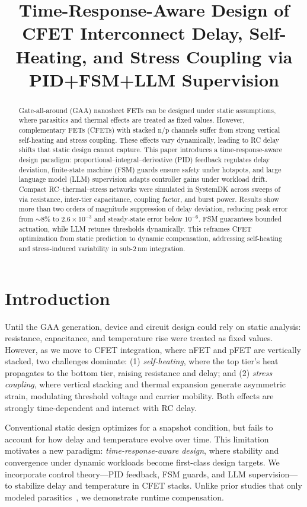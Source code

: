 \documentclass[conference]{IEEEtran}
\title{Time-Response-Aware Design of CFET Interconnect Delay, Self-Heating, and Stress Coupling via PID+FSM+LLM Supervision}
\author{
  \IEEEauthorblockN{Shinichi Samizo}
  \IEEEauthorblockA{Independent Semiconductor Researcher\\
  Project Design Hub, Samizo-AITL\\
  \textit{Email:} \href{mailto:shin3t72@gmail.com}{shin3t72@gmail.com}\quad
  \textit{GitHub:} \href{https://github.com/Samizo-AITL}{Samizo-AITL}}
}
\begin{document}
\maketitle

\begin{abstract}
Gate-all-around (GAA) nanosheet FETs can be designed under static assumptions, where parasitics and thermal effects are treated as fixed values. However, complementary FETs (CFETs) with stacked n/p channels suffer from strong vertical self-heating and stress coupling. These effects vary dynamically, leading to RC delay shifts that static design cannot capture. This paper introduces a time-response-aware design paradigm: proportional--integral--derivative (PID) feedback regulates delay deviation, finite-state machine (FSM) guards ensure safety under hotspots, and large language model (LLM) supervision adapts controller gains under workload drift. Compact RC--thermal--stress networks were simulated in SystemDK across sweeps of via resistance, inter-tier capacitance, coupling factor, and burst power. Results show more than two orders of magnitude suppression of delay deviation, reducing peak error from $\sim$8\% to $2.6\times 10^{-3}$ and steady-state error below $10^{-6}$. FSM guarantees bounded actuation, while LLM retunes thresholds dynamically. This reframes CFET optimization from static prediction to dynamic compensation, addressing self-heating and stress-induced variability in sub-2\,nm integration.
\end{abstract}

\section{Introduction}
Until the GAA generation, device and circuit design could rely on static analysis: resistance, capacitance, and temperature rise were treated as fixed values. However, as we move to CFET integration, where nFET and pFET are vertically stacked, two challenges dominate: (1) \emph{self-heating}, where the top tier's heat propagates to the bottom tier, raising resistance and delay; and (2) \emph{stress coupling}, where vertical stacking and thermal expansion generate asymmetric strain, modulating threshold voltage and carrier mobility. Both effects are strongly time-dependent and interact with RC delay.

Conventional static design optimizes for a snapshot condition, but fails to account for how delay and temperature evolve over time. This limitation motivates a new paradigm: \emph{time-response-aware design}, where stability and convergence under dynamic workloads become first-class design targets. We incorporate control theory---PID feedback, FSM guards, and LLM supervision---to stabilize delay and temperature in CFET stacks. Unlike prior studies that only modeled parasitics~\cite{yakimets2020cfet,irds2023}, we demonstrate runtime compensation.
\end{document}
